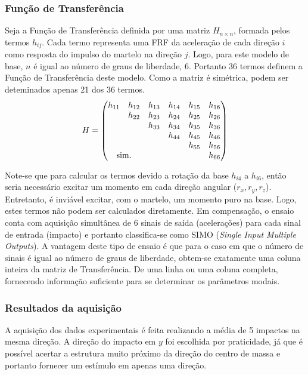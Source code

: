 \subsubsection{Função de Transferência}

Seja a Função de Transferência definida por uma matriz $H_{n \times n}$, formada
pelos termos $h_{ij}$. Cada termo representa uma FRF da aceleração de cada
direção $i$ como resposta do impulso do martelo na direção $j$. Logo, para este
modelo de base, $n$ é igual ao número de graus de liberdade, 6. Portanto 36
termos definem a Função de Transferência deste modelo. Como a matriz é
simétrica, podem ser deteminados apenas 21 dos 36 termos.
%
\begin{equation}
H =
\begin{pmatrix}
    h_{11} & h_{12} & h_{13} & h_{14} & h_{15} & h_{16} \\
		   & h_{22} & h_{23} & h_{24} & h_{25} & h_{26} \\
		   & 		& h_{33} & h_{34} & h_{35} & h_{36} \\
		   & 		&  		 & h_{44} & h_{45} & h_{46} \\
		   & 		&  		 &  	  & h_{55} & h_{56} \\
      \multicolumn{2}{c}{\text{sim.}} & & &    & h_{66} 
\end{pmatrix}
\end{equation}
%

Note-se que para calcular os termos devido a rotação da base $h_{i4}$ a
$h_{i6}$, então seria necessário excitar um momento em cada direção angular
($r_x,r_y,r_z$). Entretanto, é inviável excitar, com o martelo, um
momento puro na base. Logo, estes termos não podem ser calculados diretamente.
Em compensação, o ensaio conta com aquisição simultânea de 6 sinais de saída
(acelerações) para cada sinal de entrada (impacto) e portanto classifica-se como
SIMO (\textit{Single Input Multiple Outputs}). A vantagem deste tipo de ensaio é
que para o caso em que o número de sinais é igual ao número de graus de
liberdade, obtem-se exatamente uma coluna inteira da matriz de Transferência. De
uma linha ou uma coluna completa, fornecendo informação suficiente para se
determinar os parâmetros modais.

\subsubsection{Resultados da aquisição}

A aquisição dos dados experimentais é feita realizando a média de 5 impactos na
mesma direção. A direção do impacto em $y$ foi escolhida por praticidade, já
que é possível acertar a estrutura muito próximo da direção do centro de massa e
portanto fornecer um estímulo em apenas uma direção.

